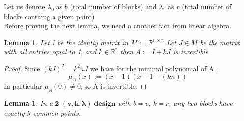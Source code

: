 \documentclass{article}
\newtheorem{lemma}[theorem]{Lemma}
\numberwithin{equation}{theorem}
\newcommand{\tParamDesign}[4]{\ensuremath{\bm{#1\mbox{-}(#2,#3,#4)\; design}}}
\newcommand{\myMatrixRing}[2]{\ensuremath{#1^{#2\times#2}}}
\begin{document}
Let us denote $\lambda_0$ as $b$ (total number of blocks) and
$\lambda_1$ as $r$ (total number of blocks containg a given point)\\
Before proving the next lemma, we need a another fact from linear algebra.
\begin{lemma}\label{invertible}
Let $I$ be the identiy matrix in {$M := \myMatrixRing{\mathbb{R}}{n}$} Let $J \in M$ be the matrix with all entries equal to 1, and $k \in \mathbb{R}^*$ then $A := I + kJ$ is invertible
\end{lemma}
\begin{proof}
Since $(kJ)^2 = k^2 n J$ we have for the minimal polynomial of A :
\[
	\mu_A(x) := (x - 1)(x - 1 - (kn))
\]
In particular $\mu_A(0) \neq 0$, so A is invertible.
\end{proof}
\begin{lemma}\label{lambdaCommonPoints}
In a {\tParamDesign{2}{v}{k}{\lambda}} with $b = v$, $k = r$, any two blocks have exactly $\lambda$ common points.
\end{lemma}
\end{document}
